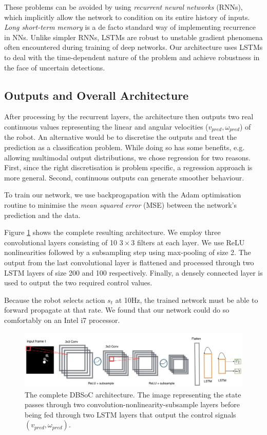 \documentclass[letterpaper, 10 pt, conference]{ieeeconf}
\begin{document}
These problems can be avoided by using \emph{recurrent neural networks} (RNNs), which implicitly allow the network to condition on its entire history of inputs.  \emph{Long short-term memory} \cite{hochreiter1997long} is a de facto standard way of implementing recurrence in NNs. Unlike simpler RNNs, LSTMs are robust to unstable gradient phenomena often encountered during training of deep networks. Our architecture uses LSTMs to deal with the time-dependent nature of the problem and achieve robustness in the face of uncertain detections.

\subsection{Outputs and Overall Architecture}
After processing by the recurrent layers, the architecture then outputs two real continuous values representing the linear and angular velocities ($v_{pred},\omega_{pred}$) of the robot. An alternative would be to discretise the outputs and treat the prediction as a classification problem. While doing so has some benefits, e.g. allowing multimodal output distributions, we chose regression for two reasons. First, since the right discretisation is problem specific, a regression approach is more general. Second, continuous outputs can generate smoother behaviour. 

To train our network, we use backprogapation with the Adam \cite{kingma2014adam} optimisation routine to minimise the \emph{mean squared error} (MSE) between the network's prediction and the data. 

Figure \ref{fig:arch} shows the complete resulting architecture. We employ three convolutional layers consisting of 10 $3 \times 3$ filters at each layer. We use ReLU nonlinearities followed by a subsampling step using max-pooling of size 2. The output from the last convolutional layer is flattened and processed through two LSTM layers of size 200 and 100 respectively. Finally, a densely connected layer is used to output the two required control values. 

Because the robot selects action $s_t$ at 10Hz, the trained network must be able to forward propagate at that rate.  We found that our network could do so comfortably on an Intel i7 processor.


  	\begin{figure}[tbh]
	\centering
    \includegraphics[scale = 0.22]{images/arch.png}
  \caption{The complete DBSoC architecture. The image representing the state passes through two convolution-nonlinearity-subsample layers before being fed through two LSTM layers that output the control signals $(v_{pred},\omega_{pred})$. }

    \vspace{-2mm}
  \label{fig:arch}
  \end{figure}
\end{document}
